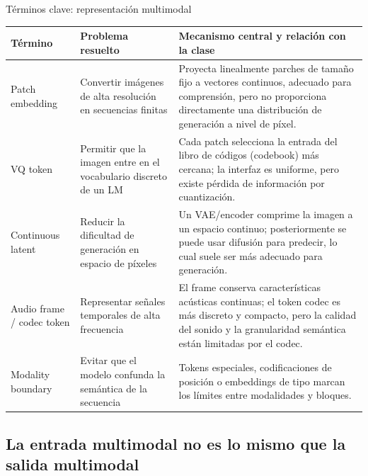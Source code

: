 
\begin{knowledgebox}{Términos clave: representación multimodal}
\begin{longtable}{L{0.20\textwidth}L{0.27\textwidth}L{0.42\textwidth}}
\toprule
Término & Problema resuelto & Mecanismo central y relación con la clase \\
\midrule
Patch embedding & Convertir imágenes de alta resolución en secuencias finitas & Proyecta linealmente parches de tamaño fijo a vectores continuos, adecuado para comprensión, pero no proporciona directamente una distribución de generación a nivel de píxel. \\
VQ token & Permitir que la imagen entre en el vocabulario discreto de un LM & Cada patch selecciona la entrada del libro de códigos (codebook) más cercana; la interfaz es uniforme, pero existe pérdida de información por cuantización. \\
Continuous latent & Reducir la dificultad de generación en espacio de píxeles & Un VAE/encoder comprime la imagen a un espacio continuo; posteriormente se puede usar difusión para predecir, lo cual suele ser más adecuado para generación. \\
Audio frame / codec token & Representar señales temporales de alta frecuencia & El frame conserva características acústicas continuas; el token codec es más discreto y compacto, pero la calidad del sonido y la granularidad semántica están limitadas por el codec. \\
Modality boundary & Evitar que el modelo confunda la semántica de la secuencia & Tokens especiales, codificaciones de posición o embeddings de tipo marcan los límites entre modalidades y bloques. \\
\bottomrule
\end{longtable}
\end{knowledgebox}


\subsection{La entrada multimodal no es lo mismo que la salida multimodal}

